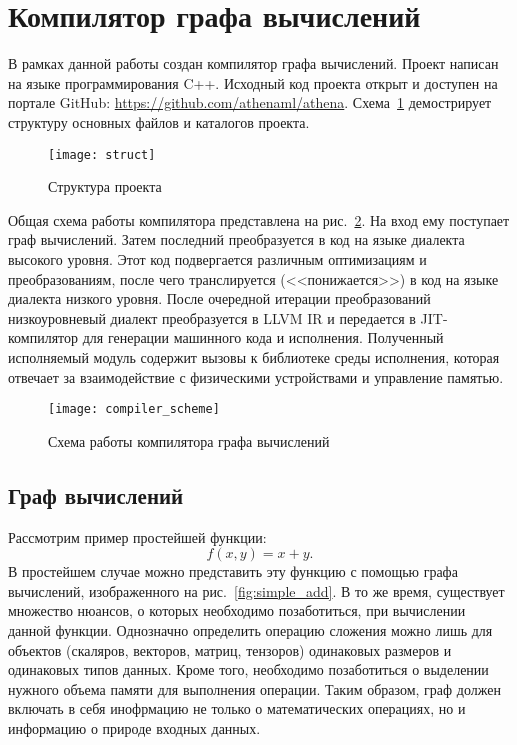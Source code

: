 \clearpage

\section{Компилятор графа вычислений}

В рамках данной работы создан компилятор графа вычислений. Проект написан
на языке программирования C++. Исходный код проекта открыт и доступен на
портале GitHub: \url{https://github.com/athenaml/athena}. Схема~\ref{fig:struct}
демострирует структуру основных файлов и каталогов проекта.

\begin{figure}[h]
  \centering
  \texttt{[image: struct]}
  \caption{Структура проекта}
  \label{fig:struct}
\end{figure}

Общая схема работы компилятора представлена на рис.~\ref{fig:compiler_scheme}. 
На вход ему поступает граф вычислений. Затем последний преобразуется в код на языке
диалекта высокого уровня. Этот код подвергается различным оптимизациям и
преобразованиям, после чего транслируется (<<понижается>>) в код на языке
диалекта низкого уровня. После очередной итерации преобразований низкоуровневый
диалект преобразуется в LLVM IR и передается в JIT-компилятор для генерации
машинного кода и исполнения. Полученный исполняемый модуль содержит вызовы к
библиотеке среды исполнения, которая отвечает за взаимодействие с физическими
устройствами и управление памятью.

\begin{figure}[h]
  \centering
  \texttt{[image: compiler\_scheme]}
  \caption{Схема работы компилятора графа вычислений}
  \label{fig:compiler_scheme}
\end{figure}
\subsection{Граф вычислений}

Рассмотрим пример простейшей функции:
\[
  f(x, y) = x + y.
\]
В простейшем случае можно представить эту функцию с помощью графа вычислений,
изображенного на рис.~\ref{fig:simple_add}. В то же время, существует множество
нюансов, о которых необходимо позаботиться, при вычислении данной функции.
Однозначно определить операцию сложения можно лишь для объектов (скаляров,
векторов, матриц, тензоров) одинаковых размеров и одинаковых типов данных.
Кроме того, необходимо позаботиться о выделении нужного объема памяти для
выполнения операции. Таким образом, граф должен включать в себя инофрмацию не
только о математических операциях, но и информацию о природе входных данных. 

